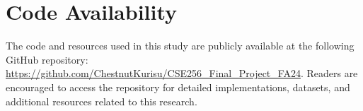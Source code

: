 \documentclass[11pt,a4paper]{article}
\begin{document}
\section{Code Availability}

The code and resources used in this study are publicly available at the following GitHub repository: \small{\url{https://github.com/ChestnutKurisu/CSE256_Final_Project_FA24}}\normalsize. Readers are encouraged to access the repository for detailed implementations, datasets, and additional resources related to this research.




\thispagestyle{ack_footer}
\end{document}
